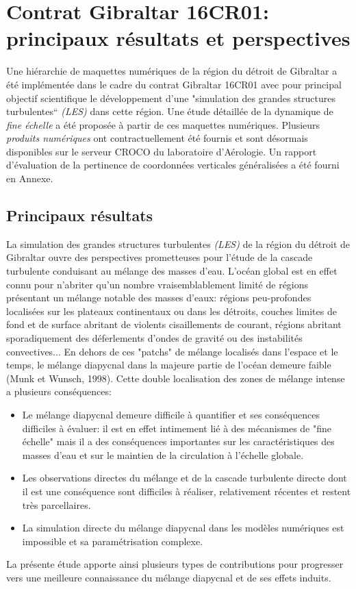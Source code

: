 \documentclass[a4paper,11pt]{report}
\begin{document}
\chapter{Contrat Gibraltar 16CR01: principaux résultats et perspectives}
\label{chapitreconclusion}

Une hiérarchie de maquettes numériques de la région du détroit de Gibraltar a été implémentée dans le cadre du contrat Gibraltar 16CR01 avec pour principal objectif scientifique le développement d'une "simulation des grandes structures turbulentes``  \textit{(LES)} dans cette région. Une étude détaillée de la dynamique de \textit{fine échelle} a été proposée à partir de ces maquettes numériques. Plusieurs \textit{produits numériques} ont contractuellement été fournis et sont désormais disponibles sur le serveur CROCO du laboratoire d'Aérologie. Un rapport d'évaluation de la pertinence de coordonnées verticales généralisées a été fourni en Annexe.\\

\section{Principaux résultats}
 
La simulation des grandes structures turbulentes \textit{(LES)} de la région du détroit de Gibraltar ouvre des perspectives prometteuses pour l'étude de la cascade turbulente conduisant au mélange des masses d'eau. L'océan global est en effet connu pour n'abriter qu'un nombre vraisemblablement limité de régions présentant un mélange notable des masses d'eaux: régions peu-profondes localisées sur les plateaux continentaux ou dans les détroits, couches limites de fond et de surface abritant de violents cisaillements de courant, régions abritant sporadiquement des déferlements d'ondes de gravité ou des instabilités convectives... En dehors de ces "patchs" de mélange localisés dans l'espace et le temps, le mélange diapycnal dans la majeure partie de l'océan demeure faible (Munk et Wunsch, 1998). Cette double localisation des zones de mélange intense a plusieurs conséquences:
 \begin{itemize}
 	\item Le mélange diapycnal demeure difficile à quantifier et ses conséquences difficiles à évaluer: il est en effet intimement lié à des mécanismes de "fine échelle" mais il a des conséquences importantes sur les caractéristiques des masses d'eau et sur le maintien de la circulation à l'échelle globale.
 	\item Les observations directes du mélange et de la cascade turbulente directe dont il est une conséquence sont difficiles à réaliser, relativement récentes et restent très parcellaires.
 	\item La simulation directe du mélange diapycnal dans les modèles numériques est impossible et sa paramétrisation complexe.
 \end{itemize}
 La présente étude apporte ainsi plusieurs types de contributions pour progresser vers une meilleure connaissance du mélange diapycnal et de ses effets induits.\\
 
\end{document}
